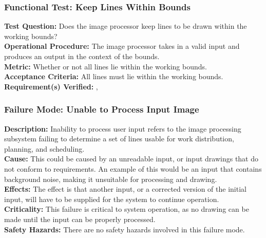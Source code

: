 \subsubsection{Functional Test: Keep Lines Within Bounds}
\label{test:image_ft_bounds}
\textbf{Test Question:} Does the image processor keep lines to be drawn within the working bounds?\\
\textbf{Operational Procedure:} The image processor takes in a valid input and produces an output in the context of the bounds. \\
\textbf{Metric:} Whether or not all lines lie within the working bounds.\\
\textbf{Acceptance Criteria:} All lines must lie within the working bounds.\\
\textbf{Requirement(s) Verified:} , 

\subsubsection{Failure Mode: Unable to Process Input Image}
\label{sec:image_fm_input}
\textbf{Description:} Inability to process user input refers to the image processing subsystem failing to determine a set of lines usable for work distribution, planning, and scheduling. \\
\textbf{Cause:} This could be caused by an unreadable input, or input drawings that do not conform to requirements. An example of this would be an input that contains background noise, making it unsuitable for processing and drawing. \\
\textbf{Effects:} The effect is that another input, or a corrected version of the initial input, will have to be supplied for the system to continue operation. \\
\textbf{Criticality:} This failure is critical to system operation, as no drawing can be made until the input can be properly processed. \\
\textbf{Safety Hazards:} There are no safety hazards involved in this failure mode.